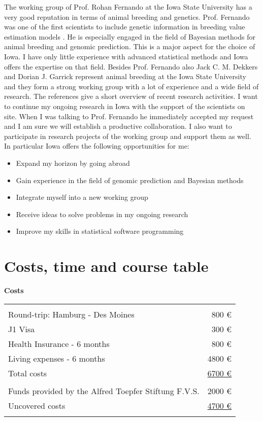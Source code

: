 \documentclass[a4paper,DIVcalc,12pt,liststotoc,headsepline,plainheadsepline]{scrartcl}
\begin{document}
The working group of Prof. Rohan Fernando at the Iowa State University has a very good reputation in terms of animal breeding and genetics. 
Prof. Fernando was one of the first scientists to include genetic information in breeding value estimation models \citep{fernando89}. He is especially engaged in the field of Bayesian methods for animal breeding and genomic prediction. This is a major aspect for the choice of Iowa. I have only little experience with advanced statistical methods and Iowa offers the expertise on that field.
Besides Prof. Fernando also Jack C. M. Dekkers and Dorian J. Garrick represent animal breeding at the Iowa State University and they form a strong working group with a lot of experience and a wide field of research. The references give a short overview of recent research activities.
I want to continue my ongoing research in Iowa with the support of the scientists on site. When I was talking to Prof. Fernando he immediately accepted my request and I am sure we will establish a productive collaboration.
I also want to participate in research projects of the working group and support them as well.
In particular Iowa offers the following opportunities for me:

\begin{itemize}
\item Expand my horizon by going abroad
\item Gain experience in the field of genomic prediction and Bayesian methods
\item Integrate myself into a new working group
\item Receive ideas to solve problems in my ongoing research
\item Improve my skills in statistical software programming
\end{itemize}

\nocite{iowa1}\nocite{iowa2}\nocite{iowa3}




\clearpage
\section{Costs, time and course table}

\textbf{Costs}

\begin{tabularx}{\textwidth}{lR}
 &  \\ 
Round-trip: Hamburg - Des Moines & 800 € \\ 
J1 Visa & 300 € \\ 
Health Insurance - 6 months & 800 € \\ 
Living expenses - 6 months & 4800 € \\ 
\hline
Total costs & \underline{\underline{6700 €}} \\ 
 &  \\ 
Funds provided by the Alfred Toepfer Stiftung F.V.S. & 2000 € \\ 
\hline
Uncovered costs & \underline{\underline{4700 €}} \\ 
 &  \\ 
\end{tabularx}
\end{document}
